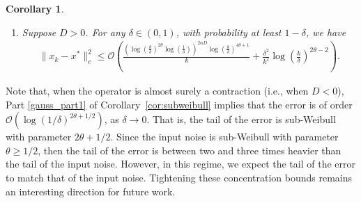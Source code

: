 \documentclass{article}
\newcommand{\lrp}[1]{\left( #1 \right)}
\newcommand{\xk}{x_k}
\newtheorem{corollary}{Corollary}[theorem]
\newtheorem{remark}{Remark}
\begin{document}
\begin{corollary}
\begin{enumerate}
\begin{align*}
    \end{align*}
    \item \label{gauss_part3} Suppose $D > 0$. For any $\delta\in(0,1)$, with probability at least $1-\delta$, we have
    \begin{align*}
        \|x_k - x^*\|^2_c \le {\mathcal{O}}\lrp{ \frac{\lrp{\log\left(\frac{k}{\delta}\right)^{2\theta} \log\left(\frac{1}{\delta}\right)}^{2\alpha D}\log\left(\frac{k}{\delta}\right)^{4\theta+1}  }{k} + \frac{\delta^2}{k^2} \log\left(\frac{k}{\delta}\right)^{2\theta-2}}.
    \end{align*}
    \end{enumerate}
\end{corollary}

Note that, when the operator is almost surely a contraction (i.e., when $D<0$), Part \ref{gauss_part1} of Corollary~\ref{cor:subweibull} implies that the error is of order $\mathcal{O}(\log(1/\delta)^{2\theta+1/2})$, as $\delta\to 0$. That is, the tail of the error is sub-Weibull with parameter $2\theta+1/2$. Since the input noise is sub-Weibull with parameter $\theta \geq 1/2$, then the tail of the error is between two and three times heavier than the tail of the input noise. However, in this regime, we expect the tail of the error to match that of the input noise. %
Tightening these concentration bounds remains an interesting direction for future work.





\end{document}
